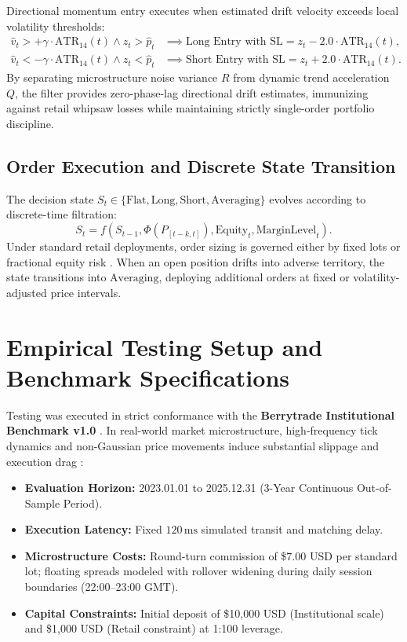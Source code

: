 \documentclass[11pt,a4paper]{article}
\begin{document}
Directional momentum entry executes when estimated drift velocity exceeds local volatility thresholds:
\begin{align}
\hat{v}_t > +\gamma \cdot \text{ATR}_{14}(t) \land z_t > \hat{p}_t & \implies \text{Long Entry with } \text{SL} = z_t - 2.0 \cdot \text{ATR}_{14}(t), \\
\hat{v}_t < -\gamma \cdot \text{ATR}_{14}(t) \land z_t < \hat{p}_t & \implies \text{Short Entry with } \text{SL} = z_t + 2.0 \cdot \text{ATR}_{14}(t).
\end{align}
By separating microstructure noise variance $R$ from dynamic trend acceleration $Q$, the filter provides zero-phase-lag directional drift estimates, immunizing against retail whipsaw losses while maintaining strictly single-order portfolio discipline.


\subsection{Order Execution and Discrete State Transition}
The decision state $S_t \in \{\text{Flat}, \text{Long}, \text{Short}, \text{Averaging}\}$ evolves according to discrete-time filtration:
\begin{equation}
S_{t} = f(S_{t-1}, \Phi(P_{[t-k, t]}), \text{Equity}_t, \text{MarginLevel}_t).
\end{equation}
Under standard retail deployments, order sizing is governed either by fixed lots or fractional equity risk \cite{lopez2018advances, carhart1997persistence}. When an open position drifts into adverse territory, the state transitions into $\text{Averaging}$, deploying additional orders at fixed or volatility-adjusted price intervals.

\section{Empirical Testing Setup and Benchmark Specifications}
Testing was executed in strict conformance with the \textbf{Berrytrade Institutional Benchmark v1.0} \cite{artsu2026illusion}. In real-world market microstructure, high-frequency tick dynamics and non-Gaussian price movements induce substantial slippage and execution drag \cite{kyle1985continuous, amihud2002illiquidity, cont2001empirical, mandelbrot1963variation}:
\begin{itemize}
    \item \textbf{Evaluation Horizon:} 2023.01.01 to 2025.12.31 (3-Year Continuous Out-of-Sample Period).
    \item \textbf{Execution Latency:} Fixed $120\,\text{ms}$ simulated transit and matching delay.
    \item \textbf{Microstructure Costs:} Round-turn commission of \$7.00 USD per standard lot; floating spreads modeled with rollover widening during daily session boundaries (22:00--23:00 GMT).
    \item \textbf{Capital Constraints:} Initial deposit of \$10,000 USD (Institutional scale) and \$1,000 USD (Retail constraint) at 1:100 leverage.
\end{itemize}
\end{document}
